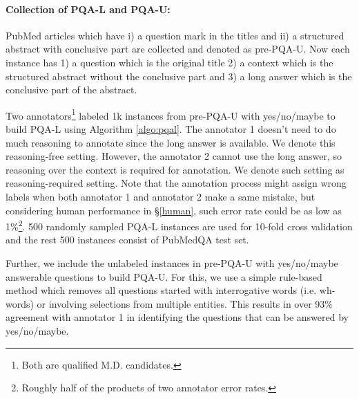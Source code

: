 \documentclass[11pt,a4paper]{article}
\begin{document}
\paragraph{Collection of PQA-L and PQA-U:} PubMed articles which have i) a question mark in the titles and ii) a structured abstract with conclusive part are collected and denoted as pre-PQA-U. Now each instance has 1) a question which is the original title 2) a context which is the structured abstract without the conclusive part and 3) a long answer which is the conclusive part of the abstract.

Two annotators\footnote{Both are qualified M.D. candidates.} labeled 1k instances from pre-PQA-U with yes/no/maybe to build PQA-L using Algorithm \ref{algo:pqal}. The annotator 1 doesn't need to do much reasoning to annotate since the long answer is available. We denote this reasoning-free setting. However, the annotator 2 cannot use the long answer, so reasoning over the context is required for annotation. We denote such setting as reasoning-required setting.
Note that the annotation process might assign wrong labels when both annotator 1 and annotator 2 make a same mistake, but considering human performance in \S\ref{human}, such error rate could be as low as 1\%\footnote{Roughly half of the products of two annotator error rates.}. 500 randomly sampled PQA-L instances are used for 10-fold cross validation and the rest 500 instances consist of PubMedQA test set.

Further, we include the unlabeled instances in pre-PQA-U with yes/no/maybe answerable questions to build PQA-U. For this, we use a simple rule-based method which removes all questions started with interrogative words (i.e. wh-words) or involving selections from multiple entities. This results in over 93\% agreement with annotator 1 in identifying the questions that can be answered by yes/no/maybe.
\end{document}
